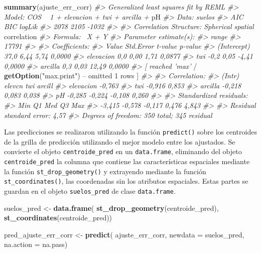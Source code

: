 \documentclass[11pt,b5paper,]{krantz}
\newenvironment{Shaded}{}{}
\newcommand{\KeywordTok}[1]{\textcolor[rgb]{0.00,0.44,0.13}{\textbf{#1}}}
\newcommand{\DataTypeTok}[1]{\textcolor[rgb]{0.56,0.13,0.00}{#1}}
\newcommand{\DecValTok}[1]{\textcolor[rgb]{0.25,0.63,0.44}{#1}}
\newcommand{\StringTok}[1]{\textcolor[rgb]{0.25,0.44,0.63}{#1}}
\newcommand{\CommentTok}[1]{\textcolor[rgb]{0.38,0.63,0.69}{\textit{#1}}}
\newcommand{\OperatorTok}[1]{\textcolor[rgb]{0.40,0.40,0.40}{#1}}
\newcommand{\NormalTok}[1]{#1}
\begin{document}
\begin{Shaded}
\begin{Highlighting}[]
\KeywordTok{summary}\NormalTok{(ajuste_err_corr)}
\CommentTok{#> Generalized least squares fit by REML}
\CommentTok{#> Model: COS ~ 1 + elevacion + twi + arcilla +}
\NormalTok{pH}
\CommentTok{#> Data: suelos}
\CommentTok{#> AIC BIC logLik}
\CommentTok{#> 2078 2105 -1032}
\CommentTok{#>}
\CommentTok{#> Correlation Structure: Spherical spatial}
\NormalTok{correlation}
\CommentTok{#> Formula: ~X + Y}
\CommentTok{#> Parameter estimate(s):}
\CommentTok{#> range}
\CommentTok{#> 17791}
\CommentTok{#>}
\CommentTok{#> Coefficients:}
\CommentTok{#> Value Std.Error t-value p-value}
\CommentTok{#> (Intercept) 37,0 6,44 5,74 0,0000}
\CommentTok{#> elevacion 0,0 0,00 1,71 0,0877}
\CommentTok{#> twi -0,2 0,05 -4,41 0,0000}
\CommentTok{#> arcilla 0,3 0,03 12,49 0,0000}
\CommentTok{#> [ reached 'max'}
    \OperatorTok{/}\StringTok{ }\KeywordTok{getOption}\NormalTok{(}\StringTok{"max.print"}\NormalTok{) }\OperatorTok{--}
\NormalTok{omitted }\DecValTok{1}\NormalTok{ rows ]}
\CommentTok{#>}
\CommentTok{#> Correlation:}
\CommentTok{#> (Intr) elevcn twi arcill}
\CommentTok{#> elevacion -0,763}
\CommentTok{#> twi -0,916 0,853}
\CommentTok{#> arcilla -0,218 0,083 0,038}
\CommentTok{#> pH -0,285 -0,224 -0,108 0,260}
\CommentTok{#>}
\CommentTok{#> Standardized residuals:}
\CommentTok{#> Min Q1 Med Q3 Max}
\CommentTok{#> -3,415 -0,578 -0,117 0,476 4,843}
\CommentTok{#>}
\CommentTok{#> Residual standard error: 4,57}
\CommentTok{#> Degrees of freedom: 350 total; 345 residual}
\end{Highlighting}
\end{Shaded}

Las predicciones se realizaron utilizando la función \texttt{predict()}
sobre los centroides de la grilla de predicción utilizando el mejor
modelo entre los ajustados. Se convierte el objeto
\texttt{centroide\_pred} en un \texttt{data.frame}, eliminando del
objeto \texttt{centroide\_pred} la columna que contiene las
características espaciales mediante la función
\texttt{st\_drop\_geometry()} y extrayendo mediante la función
\texttt{st\_coordinates()}, las coordenadas sin los atributos
espaciales. Estas partes se guardan en el objeto \texttt{suelos\_pred}
de clase \texttt{data.frame}.

\begin{Shaded}
\begin{Highlighting}[]
\NormalTok{suelos_pred <-}\StringTok{ }\KeywordTok{data.frame}\NormalTok{(}
  \KeywordTok{st_drop_geometry}\NormalTok{(centroide_pred),}
  \KeywordTok{st_coordinates}\NormalTok{(centroide_pred))}


\NormalTok{pred_ajuste_err_corr <-}\StringTok{ }\KeywordTok{predict}\NormalTok{(}
\NormalTok{  ajuste_err_corr,}
  \DataTypeTok{newdata =}\NormalTok{ suelos_pred,}
  \DataTypeTok{na.action =}\NormalTok{ na.pass)}
\end{Highlighting}
\end{Shaded}
\end{document}
